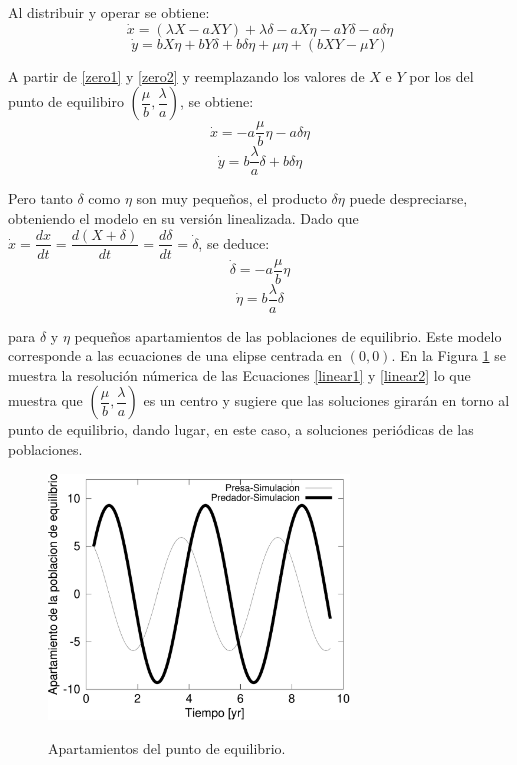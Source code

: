 \documentclass{article}
\numberwithin{equation}{section}
\begin{document}
\begin{multicols}{2}
Al distribuir y operar se obtiene:
\begin{equation}
\dot x = (\lambda X -aXY )+ \lambda \delta - a X\eta -a Y\delta -a \delta \eta
\end{equation}
\begin{equation}
\dot y = b X\eta + bY\delta + b\delta \eta + \mu \eta +( bXY - \mu Y )
\end{equation}

A partir de \ref{zero1} y \ref{zero2} y reemplazando los valores de $X$ e $Y$ por los del punto de equilibiro $(\dfrac{\mu}{b},\dfrac{\lambda}{a})$, se obtiene:
\begin{equation}
\dot x =  - a \dfrac{\mu}{b}\eta - a \delta \eta
\end{equation}
\begin{equation}
\dot y = b\dfrac{\lambda}{a}\delta + b\delta \eta 
\end{equation}

Pero tanto $\delta$ como $\eta$ son muy pequeños, el producto $\delta \eta$ puede despreciarse, obteniendo el modelo en su versión linealizada. 
Dado que $\dot x = \dfrac{d x}{d t} = \dfrac{d (X + \delta)}{d t} = \dfrac{d \delta}{d t} = \dot \delta$, se deduce:
\begin{equation}
\label{linear1}
\dot \delta =  - a \dfrac{\mu}{b}\eta
\end{equation}
\begin{equation}
\label{linear2}
\dot \eta = b\dfrac{\lambda}{a}\delta
\end{equation}

para $\delta$ y $\eta$ pequeños apartamientos de las poblaciones de equilibrio. Este modelo corresponde a las ecuaciones de una elipse centrada en $(0,0)$. En la Figura \ref{d1} se muestra la resolución númerica de las Ecuaciones \ref{linear1} y \ref{linear2} lo que muestra que $(\dfrac{\mu}{b},\dfrac{\lambda}{a})$ es un centro y sugiere que las soluciones girarán en torno al punto de equilibrio, dando lugar, en este caso, a soluciones periódicas de las poblaciones.


\begin{figure}[H]
\centering
\includegraphics[width=8cm]{images/d1} \
\caption{Apartamientos del punto de equilibrio.}
\label{d1}
\end{figure}



\end{multicols}
\end{document}
